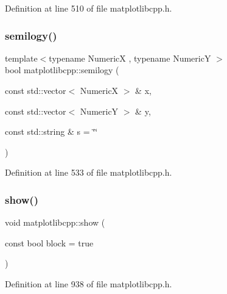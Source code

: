 Definition at line 510 of file matplotlibcpp.\+h.

\mbox{\label{namespacematplotlibcpp_a4dce9b4c1c16c1dab0cffd11588d4db8}} 
\subsubsection{\texorpdfstring{semilogy()}{semilogy()}}
{\footnotesize\ttfamily template$<$typename NumericX , typename NumericY $>$ \\
bool matplotlibcpp\+::semilogy (\begin{DoxyParamCaption}\item[{const std\+::vector$<$ NumericX $>$ \&}]{x,  }\item[{const std\+::vector$<$ NumericY $>$ \&}]{y,  }\item[{const std\+::string \&}]{s = {\ttfamily \char`\"{}\char`\"{}} }\end{DoxyParamCaption})}



Definition at line 533 of file matplotlibcpp.\+h.

\mbox{\label{namespacematplotlibcpp_ac7b2ae71a81811dfb69bcef95ee8390d}} 
\subsubsection{\texorpdfstring{show()}{show()}}
{\footnotesize\ttfamily void matplotlibcpp\+::show (\begin{DoxyParamCaption}\item[{const bool}]{block = {\ttfamily true} }\end{DoxyParamCaption})\hspace{0.3cm}{\ttfamily [inline]}}



Definition at line 938 of file matplotlibcpp.\+h.

\mbox{\label{namespacematplotlibcpp_ae3c91bdfbe011133346dcc4f31ec5932}} 
